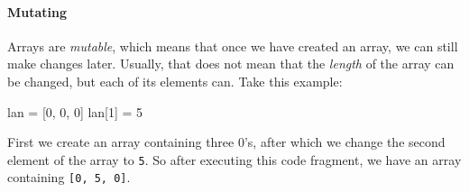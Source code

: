\paragraph{Mutating}

Arrays are \emph{mutable}, which means that once we have created an array, we can still make changes later. Usually, that does not mean that the \emph{length} of the array can be changed, but each of its elements can. Take this example:

\begin{nnflisting}
lan = [0, 0, 0]
lan[1] = 5
\end{nnflisting}

First we create an array containing three 0's, after which we change the second element of the array to \texttt{5}. So after executing this code fragment, we have an array containing \texttt{[0, 5, 0]}.
